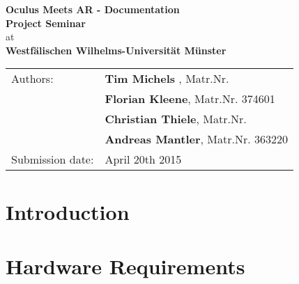 



	\begin{center}
		\vspace*{54mm}
		{
			\renewcommand{\baselinestretch}{0.9}\normalsize
			\Large
			\textbf{Oculus Meets AR - Documentation}\\
		}
		\vspace*{15.5mm}
		{
			\large
			\textbf{Project Seminar}\\
		}
		\vspace*{10mm}
		{
			at\\
			\textbf{Westfälischen Wilhelms-Universität Münster}\\
		}
		\vspace*{100mm}
		\begin{tabular*}{137mm}{ll}
			Authors: 		& \textbf{Tim Michels }, Matr.Nr. \\
						& \textbf{Florian Kleene}, Matr.Nr. 374601\\
						& \textbf{Christian Thiele}, Matr.Nr. \\
						& \textbf{Andreas Mantler}, Matr.Nr. 363220\\
			Submission date: 	& April 20th 2015
		\end{tabular*}
	\end{center}
	\newpage
	
	\thispagestyle{empty}\quad\newpage
	
	\thispagestyle{empty}
	\tableofcontents
	\vfill
	\newpage

	\thispagestyle{empty}\quad\newpage
	
	\setcounter{page}{1}
	\pagestyle{scrheadings}
	\setfootsepline{0pt} 
	\ihead[\chaptername\ \thechapter: \leftmark]{\chaptername\ \thechapter: \leftmark}
	\cfoot[\vspace*{9mm}\pagemark]{\vspace*{9mm}\pagemark}
	\renewcommand{\baselinestretch}{1.3}\normalsize

	\chapter{Introduction}
	\label{sec:introduction}
		

	\chapter{Hardware Requirements}
	\label{sec:hardware_requirements}
	
	
